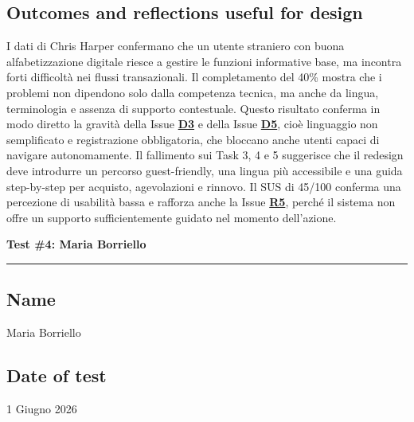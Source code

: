 \documentclass[11pt,a4paper]{article}
\begin{document}
\subsection*{Outcomes and reflections useful for design}
\begin{tcolorbox}[colback=backgroundColor,colframe=borderColor,arc=2mm]
I dati di Chris Harper confermano che un utente straniero con buona alfabetizzazione digitale riesce a gestire le funzioni informative base, ma incontra forti difficoltà nei flussi transazionali. Il completamento del 40\% mostra che i problemi non dipendono solo dalla competenza tecnica, ma anche da lingua, terminologia e assenza di supporto contestuale. Questo risultato conferma in modo diretto la gravità della Issue \textbf{\hyperref[iss:D3]{D3}} e della Issue \textbf{\hyperref[iss:D5]{D5}}, cioè linguaggio non semplificato e registrazione obbligatoria, che bloccano anche utenti capaci di navigare autonomamente. Il fallimento sui Task 3, 4 e 5 suggerisce che il redesign deve introdurre un percorso guest-friendly, una lingua più accessibile e una guida step-by-step per acquisto, agevolazioni e rinnovo. Il SUS di 45/100 conferma una percezione di usabilità bassa e rafforza anche la Issue \textbf{\hyperref[iss:R5]{R5}}, perché il sistema non offre un supporto sufficientemente guidato nel momento dell’azione.
\end{tcolorbox}

\newpage
\begin{center}
  {\color{primaryColor}\large\bfseries Test \#4: Maria Borriello}\\
  \vspace{0.1cm}
  \color{borderColor}\hrule
\end{center}

\vspace{0.5cm}

\subsection*{Name \normalfont\small\itshape}
\begin{tcolorbox}[colback=backgroundColor,colframe=borderColor,arc=2mm]
Maria Borriello
\end{tcolorbox}

\subsection*{Date of test}
\begin{tcolorbox}[colback=backgroundColor,colframe=borderColor,arc=2mm]
1 Giugno 2026
\end{tcolorbox}
\end{document}
